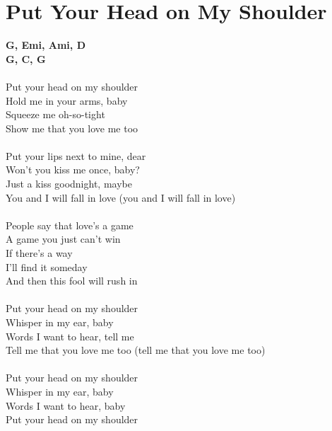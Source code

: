\section{Put Your Head on My Shoulder}
\footnotesize\textbf{G, Emi, Ami, D\9 \\
G, C, G}\\
\normalsize
\\
Put your head on my shoulder\\
Hold me in your arms, baby\\
Squeeze me oh-so-tight\\
Show me that you love me too\\
\\
Put your lips next to mine, dear\\
Won't you kiss me once, baby?\\
Just a kiss goodnight, maybe\\
You and I will fall in love (you and I will fall in love)\\
\\
People say that love's a game\\
A game you just can't win\\
If there's a way\\
I'll find it someday\\
And then this fool will rush in\\
\\
Put your head on my shoulder\\
Whisper in my ear, baby\\
Words I want to hear, tell me\\
Tell me that you love me too (tell me that you love me too)\\
\\
Put your head on my shoulder\\
Whisper in my ear, baby\\
Words I want to hear, baby\\
Put your head on my shoulder\\
